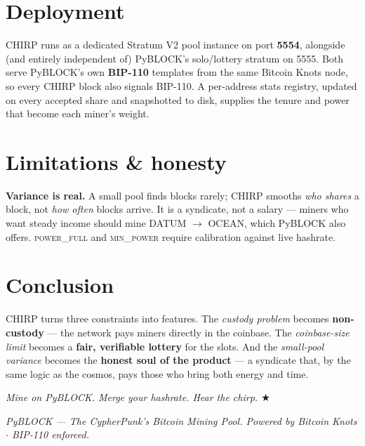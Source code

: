 \documentclass[11pt]{article}
\begin{document}
\section{Deployment}
CHIRP runs as a dedicated Stratum V2 pool instance on port \textbf{5554}, alongside (and entirely
independent of) PyBLOCK's solo/lottery stratum on 5555. Both serve PyBLOCK's own \textbf{BIP-110}
templates from the same Bitcoin Knots node, so every CHIRP block also signals BIP-110. A per-address
stats registry, updated on every accepted share and snapshotted to disk, supplies the tenure and
power that become each miner's weight.

\section{Limitations \& honesty}
\textbf{Variance is real.} A small pool finds blocks rarely; CHIRP smooths \emph{who shares} a
block, not \emph{how often} blocks arrive. It is a syndicate, not a salary --- miners who want
steady income should mine DATUM $\to$ OCEAN, which PyBLOCK also offers. \textsc{power\_full} and
\textsc{min\_power} require calibration against live hashrate.

\section{Conclusion}
CHIRP turns three constraints into features. The \emph{custody problem} becomes \textbf{non-custody}
--- the network pays miners directly in the coinbase. The \emph{coinbase-size limit} becomes a
\textbf{fair, verifiable lottery} for the slots. And the \emph{small-pool variance} becomes the
\textbf{honest soul of the product} --- a syndicate that, by the same logic as the cosmos, pays
those who bring both energy and time.

\begin{center}\itshape
Mine on PyBLOCK. Merge your hashrate. Hear the chirp. \quad $\bigstar$
\end{center}

\vfill
\begin{center}\small
\textit{PyBLOCK --- The CypherPunk's Bitcoin Mining Pool. Powered by Bitcoin Knots $\cdot$ BIP-110 enforced.}
\end{center}
\end{document}
